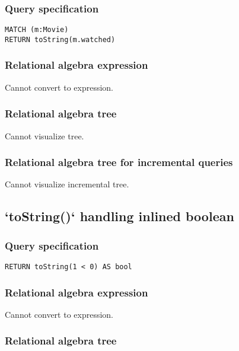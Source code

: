 \subsubsection*{Query specification}

\begin{lstlisting}
MATCH (m:Movie)
RETURN toString(m.watched)
\end{lstlisting}

\subsubsection*{Relational algebra expression}

Cannot convert to expression.

\subsubsection*{Relational algebra tree}

Cannot visualize tree.

\subsubsection*{Relational algebra tree for incremental queries}

Cannot visualize incremental tree.

\subsection{`toString()` handling inlined boolean}

\subsubsection*{Query specification}

\begin{lstlisting}
RETURN toString(1 < 0) AS bool
\end{lstlisting}

\subsubsection*{Relational algebra expression}

Cannot convert to expression.

\subsubsection*{Relational algebra tree}

